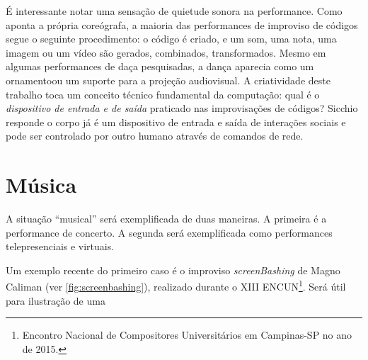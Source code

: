 É interessante notar uma sensação de quietude sonora na performance. Como aponta a própria coreógrafa, a maioria das performances de improviso de códigos segue o seguinte procedimento: o código é criado, e um som, uma nota, uma imagem ou um vídeo são gerados, combinados, transformados. Mesmo em algumas performances de daça pesquisadas, a dança aparecia como um ornamentoou um suporte para a projeção audiovisual. A criatividade deste trabalho toca um conceito técnico fundamental da computação: qual é o \emph{dispositivo de entrada e de saída} praticado nas improvisações de códigos? Sicchio responde o corpo já é um dispositivo de entrada e saída de interações sociais e pode ser controlado por outro humano através de comandos de rede.  


\section{Música}\label{sec:musica}

A situação ``musical'' será exemplificada de duas maneiras. A primeira é a performance de concerto. A segunda será exemplificada como performances telepresenciais e virtuais.

Um exemplo recente do primeiro caso é o improviso \emph{screenBashing} de Magno Caliman (ver \autoref{fig:screenbashing}), realizado durante o XIII ENCUN\footnote{Encontro Nacional de Compositores Universitários em Campinas-SP no ano de 2015.}. Será útil para ilustração de uma \cite[p.~1]{mclean_tidal_2010}

